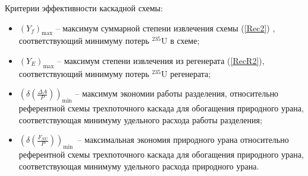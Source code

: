 Критерии эффективности каскадной схемы:
\begin{itemize}
    \item $(Y_f)_\text{max}$ -- максимум суммарной степени извлечения схемы (\ref{Rec2}) , соответствующий минимуму потерь $^{235}$U в схеме;
    \item $(Y_{E})_\text{max}$ -- максимум степени извлечения из регенерата (\ref{RecR2}), соответствующий минимуму потерь $^{235}$U регенерата;
    \item $(\delta(\frac{\Delta A}{P}))_\text{min}$ -- максимум экономии работы разделения, относительно референтной схемы трехпоточного каскада для обогащения природного урана, соответствующая минимуму удельного расхода работы разделения; 
    \item $(\delta(\frac{F_{NU}}{P}))_\text{min}$\ -- максимальная экономия природного урана относительно референтной схемы трехпоточного каскада для обогащения природного урана, соответствующая минимуму удельного расхода природного урана.
\end{itemize}\label{criteria_list}

